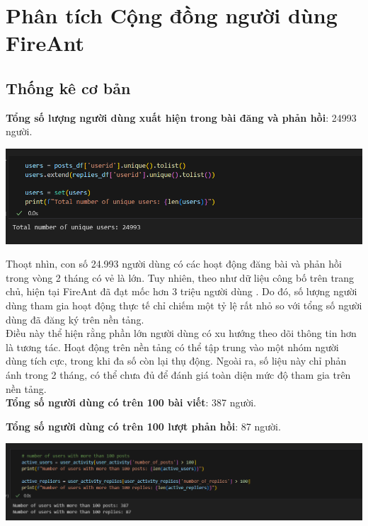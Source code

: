 \section{Phân tích Cộng đồng người dùng FireAnt}
\subsection{Thống kê cơ bản}
\textbf{Tổng số lượng người dùng xuất hiện trong bài đăng và phản hồi}: 24993 người.

\begin{center}
    \includegraphics[width=0.75\linewidth]{images/C2_pic54.png}
\end{center}

Thoạt nhìn, con số 24.993 người dùng có các hoạt động đăng bài và phản hồi trong vòng 2 tháng có vẻ là lớn. Tuy nhiên, theo như dữ liệu công bố trên trang chủ, hiện tại FireAnt đã đạt mốc hơn 3 triệu người dùng \cite{fireant}. Do đó, số lượng người dùng tham gia hoạt động thực tế chỉ chiếm một tỷ lệ rất nhỏ so với tổng số người dùng đã đăng ký trên nền tảng. \\

Điều này thể hiện rằng phần lớn người dùng có xu hướng theo dõi thông tin hơn là tương tác. Hoạt động trên nền tảng có thể tập trung vào một nhóm người dùng tích cực, trong khi đa số còn lại thụ động. Ngoài ra, số liệu này chỉ phản ánh trong 2 tháng, có thể chưa đủ để đánh giá toàn diện mức độ tham gia trên nền tảng.\\

\textbf{Tổng số người dùng có trên 100 bài viết}: 387 người.

\textbf{Tổng số người dùng có trên 100 lượt phản hồi}: 87 người.

\begin{center}
    \includegraphics[width=0.95\linewidth]{images/C2_pic53.png}
\end{center}

